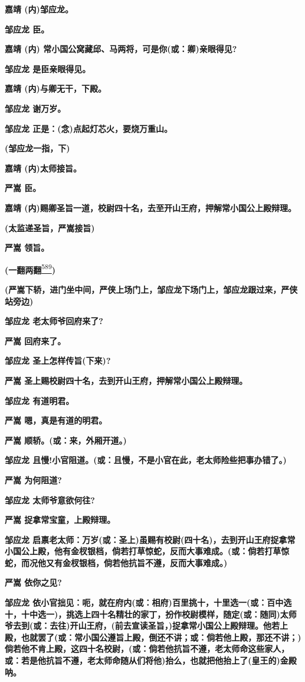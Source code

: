 \textbf{嘉靖 (内)邹应龙。}

\textbf{邹应龙 臣。}

\textbf{嘉靖 (内) 常小国公窝藏邱、马两将，可是你(或：卿)亲眼得见?}

\textbf{邹应龙 是臣亲眼得见。}

\textbf{嘉靖 (内)与卿无干，下殿。}

\textbf{邹应龙 谢万岁。}

\textbf{邹应龙 正是：(念)点起灯芯火，要烧万重山。}

\textbf{(邹应龙一指，下)}

\textbf{嘉靖 (内)太师接旨。}

\textbf{严嵩 臣。}

\textbf{嘉靖
(内)赐卿圣旨一道，校尉四十名，去至开山王府，押解常小国公上殿辩理。}

\textbf{(太监递圣旨，严嵩接旨)}

\textbf{严嵩 领旨。}

\textbf{(一翻两翻}\protect\hyperlink{fn589}{\textsuperscript{589}}\textbf{)}

\textbf{(严嵩下轿，进门坐中间，严侠上场门上，邹应龙下场门上，邹应龙跟过来，严侠站旁边)}

\textbf{邹应龙 老太师爷回府来了?}

\textbf{严嵩 回府来了。}

\textbf{邹应龙 圣上怎样传旨(下来)?}

\textbf{严嵩 圣上赐校尉四十名，去到开山王府，押解常小国公上殿辩理。}

\textbf{邹应龙 有道明君。}

\textbf{严嵩 嗯，真是有道的明君。}

\textbf{严嵩 顺轿。(或：来，外厢开道。)}

\textbf{邹应龙
且慢!小官阻道。(或：且慢，不是小官在此，老太师险些把事办错了。)}

\textbf{严嵩 为何阻道?}

\textbf{邹应龙 太师爷意欲何往?}

\textbf{严嵩 捉拿常宝童，上殿辩理。}

\textbf{邹应龙
启禀老太师：万岁(或：圣上)虽赐有校尉(四十名)，去到开山王府捉拿常小国公上殿，他有金杈银档，倘若打草惊蛇，反而大事难成。(或：倘若打草惊蛇，而况他又有金杈银档，倘若他抗旨不遵，反而大事难成。)}

\textbf{严嵩 依你之见?}

\textbf{邹应龙
依小官拙见：呃，就在府内(或：相府)百里挑十，十里选一(或：百中选十，十中选一)，挑选上四十名精壮的家丁，扮作校尉模样，随定(或：随同)太师爷去到(或：去往)开山王府，(前去宣读圣旨，)捉拿常小国公上殿辩理。他若上殿，也就罢了(或：常小国公遵旨上殿，倒还不讲；或：倘若他上殿，那还不讲；)倘若他不肯上殿，这四十名校尉，(或：倘若他抗旨不遵，老太师命这些家人，或：若是他抗旨不遵，老太师命随从们将他)抬么，也就把他抬上了(皇王的)金殿呐。}

